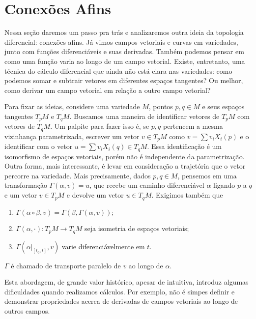 \section{Conexões Afins}
\label{loc:capítulo_3_:_métricas_e_conexões.conexões_afins}
Nessa seção daremos um passo pra trás e analizaremos outra ideia da topologia diferencial: conexões afins.
Já vimos campos vetoriais e curvas em variedades, junto com funções diferenciáveis e suas derivadas. Também podemos pensar em como uma função varia ao longo de um campo vetorial. Existe, entretanto, uma técnica do cálculo diferencial que ainda não está clara nas variedades: como podemos somar e subtrair vetores em diferentes espaços tangentes? Ou melhor, como derivar um campo vetorial em relação a outro campo vetorial?

Para fixar as ideias, considere uma variedade $M$, pontos $p,q \in M$ e seus espaços tangentes $T_{p}M$ e $T_{q}M$. Buscamos uma maneira de identificar vetores de $T_{p}M$ com vetores de $T_{q}M$.
Um palpite para fazer isso é, se $p, q$ pertencem a mesma vizinhança parametrizada, escrever um vetor $v \in T_{p}M$ como $v=\sum v_{i}X_{i}(p)$ e o identificar com o vetor $u=\sum v_{i}X_{i}(q) \in T_{q}M$. Essa identificação é um isomorfismo de espaços vetoriais, porém não é independente da parametrização. Outra forma, mais interessante, é levar em consideração a trajetória que o vetor percorre na variedade. Mais precisamente, dados $p,q \in M$, pensemos em uma transformação $\Gamma(\alpha, v) = u$, que recebe um caminho diferenciável $\alpha$ ligando $p$ a $q$ e um vetor $v \in T_{p}M$ e devolve um vetor $u \in T_{q}M$. Exigimos também que
\begin{enumerate}
    \item $\Gamma(\alpha \circ \beta, v) = \Gamma(\beta, \Gamma(\alpha, v));$
    \item $\Gamma(\alpha, \cdot):T_{p}M\to T_{q}M$ seja isometria de espaços vetoriais;
    \item $\Gamma(\alpha|_{[t_{0},t]},v)$ varie diferenciávelmente em $t$.
\end{enumerate}

$\Gamma$ é chamado de transporte paralelo de $v$ ao longo de $\alpha$.

Esta abordagem, de grande valor histórico, apesar de intuitiva, introduz algumas dificuldades quando realizamos cálculos. Por exemplo, não é simpes definir e demonstrar propriedades acerca de derivadas de campos vetoriais ao longo de outros campos.

